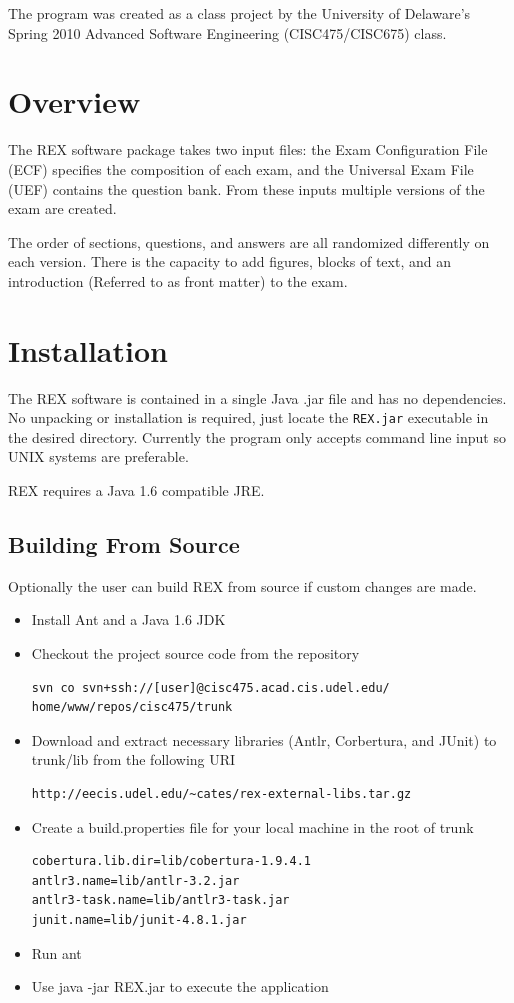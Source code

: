 \documentclass{article}
\begin{document}
The program was created as a class project by the University of Delaware's 
Spring 2010 Advanced Software Engineering (CISC475/CISC675) class.  

\section{Overview}
The REX software package takes two input files: the Exam Configuration File
(ECF) specifies the composition of each exam, and the Universal Exam File
(UEF) contains the question bank. From these inputs multiple versions of the
exam are created. 

The order of sections, questions, and answers are all randomized differently on each version. There is the capacity to add figures, blocks of text, and an introduction (Referred to as front matter) to the exam. 


\section{Installation}
The REX software is contained in a single Java .jar file and has no
dependencies. No unpacking or installation is required, just locate the
\texttt{REX.jar} executable in the desired directory. Currently the program
only accepts command line input so UNIX systems are preferable. 

REX requires a Java 1.6 compatible JRE. 

\subsection{Building From Source}
Optionally the user can build REX from source if custom changes are made. 
\begin{itemize}
\item Install Ant and a Java 1.6 JDK
\item Checkout the project source code from the repository
\begin{verbatim}
svn co svn+ssh://[user]@cisc475.acad.cis.udel.edu/
home/www/repos/cisc475/trunk
\end{verbatim}
\item Download and extract necessary libraries (Antlr, Corbertura, and JUnit) to
trunk/lib from the following URI
\begin{verbatim}
http://eecis.udel.edu/~cates/rex-external-libs.tar.gz
\end{verbatim}
\item Create a build.properties file for your local machine in the root of trunk
\begin{verbatim}
cobertura.lib.dir=lib/cobertura-1.9.4.1
antlr3.name=lib/antlr-3.2.jar
antlr3-task.name=lib/antlr3-task.jar
junit.name=lib/junit-4.8.1.jar
\end{verbatim}
\item Run ant
\item Use java -jar REX.jar to execute the application
\end{itemize}
\end{document}
